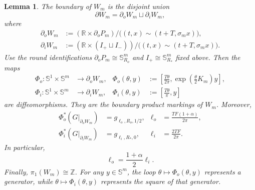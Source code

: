 \documentclass[11pt,reqno]{amsart}
\newtheorem{lemma}[theorem]{Lemma}
\theoremstyle{definition}
\numberwithin{equation}{section}
\begin{document}
\begin{lemma}
\label{lem:un-boundary-components}
The boundary of \(W_m\) is the disjoint union
\[
                         \partial W_m=\partial_oW_m\sqcup\partial_iW_m,
\]
where
\begin{align*}
 \partial_oW_m
 &:=(\mathbb R\times\partial_oP_m)/
   \bigl((t,x)\sim(t+T,\sigma_mx)\bigr),\\
 \partial_iW_m
 &:=(\mathbb R\times(I_+\sqcup I_-))/
   \bigl((t,x)\sim(t+T,\sigma_mx)\bigr).
\end{align*}
Use the round identifications
\(\partial_oP_m\cong\mathbb S^m_{R_o}\) and
\(I_+\cong\mathbb S^m_{R_*}\) fixed above.  Then the maps
\begin{align}
 \Phi_o:\mathbb S^1\times\mathbb S^m&\longrightarrow\partial_oW_m,
 &\Phi_o(\theta,y)
   &:=\left[\frac{T\theta}{2\pi},
       \exp\left(\frac\theta2K_m\right)y\right],
 \label{eq:un-outer-product-map}\\
 \Phi_i:\mathbb S^1\times\mathbb S^m&\longrightarrow\partial_iW_m,
 &\Phi_i(\theta,y)&:=\left[\frac{T\theta}{\pi},y\right]
 \label{eq:un-inner-product-map}
\end{align}
are diffeomorphisms.  They are the boundary product markings of $W_m$.
Moreover,
\begin{align}
 \Phi_o^*(G|_{\partial_oW_m})&=g_{\ell_o,R_o,1/2},&
 \ell_o&=\frac{TF(1+\alpha)}{2\pi},
 \label{eq:un-outer-boundary-metric}\\
 \Phi_i^*(G|_{\partial_iW_m})&=g_{\ell_i,R_*,0},&
 \ell_i&=\frac{2TF}{2\pi}.
 \label{eq:un-inner-boundary-metric}
\end{align}
In particular,
\begin{equation}\label{eq:un-axial-ratio}
                         \ell_o=\frac{1+\alpha}{2}\ell_i.
\end{equation}
Finally, \(\pi_1(W_m)\cong\mathbb Z\).  For any \(y\in\mathbb S^m\),
the loop \(\theta\mapsto\Phi_o(\theta,y)\) represents a generator, while
\(\theta\mapsto\Phi_i(\theta,y)\) represents the square of that
generator.
\end{lemma}
\end{document}
